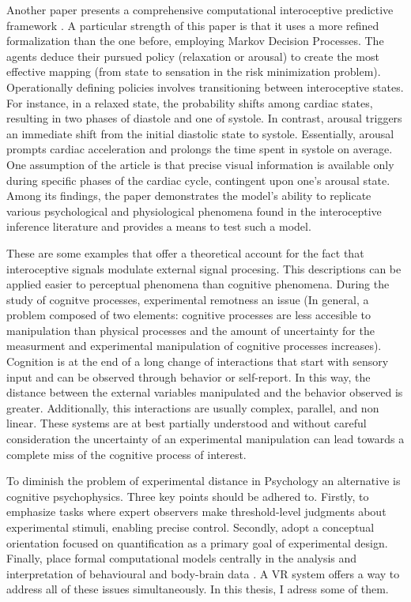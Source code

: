 \documentclass[12pt,oneside,openright]{report}
\begin{document}
Another paper presents a comprehensive computational interoceptive predictive framework \parencite{Allen2022}. A particular strength of this paper is that it uses a more refined formalization than the one before, employing Markov Decision Processes. The agents deduce their pursued policy (relaxation or arousal) to create the most effective mapping (from state to sensation in the risk minimization problem). Operationally defining policies involves transitioning between interoceptive states. For instance, in a relaxed state, the probability shifts among cardiac states, resulting in two phases of diastole and one of systole. In contrast, arousal triggers an immediate shift from the initial diastolic state to systole. Essentially, arousal prompts cardiac acceleration and prolongs the time spent in systole on average. One assumption of the article is that precise visual information is available only during specific phases of the cardiac cycle, contingent upon one's arousal state. Among its findings, the paper demonstrates the model's ability to replicate various psychological and physiological phenomena found in the interoceptive inference literature and provides a means to test such a model.

These are some examples that offer a theoretical account for the fact that interoceptive signals modulate external signal procesing. This descriptions can be applied easier to perceptual phenomena than cognitive phenomena. During the study of cognitve processes, experimental remotness an issue (In general, a problem composed of two elements: cognitive processes are less accesible to manipulation than physical processes and the amount of uncertainty for the measurment and experimental manipulation of cognitive processes increases). Cognition is at the end of a long change of interactions that start with sensory input and can be observed through behavior or self-report. In this way, the distance between the external variables manipulated and the behavior observed is greater. Additionally, this interactions are usually complex, parallel, and non linear. These systems are at best partially understood and without careful consideration the uncertainty of an experimental manipulation can lead towards a complete miss of the cognitive process of interest\parencite{WASKOM2019100}.

To diminish the problem of experimental distance in Psychology an alternative is cognitive psychophysics. Three key points should be adhered to. Firstly, to emphasize tasks where expert observers make threshold-level judgments about experimental stimuli, enabling precise control. Secondly, adopt a conceptual orientation focused on quantification as a primary goal of experimental design. Finally, place formal computational models centrally in the analysis and interpretation of behavioural and body-brain data \parencite{WASKOM2019100}. A VR system offers a way to address all of these issues simultaneously. In this thesis, I adress some of them. 
\end{document}
